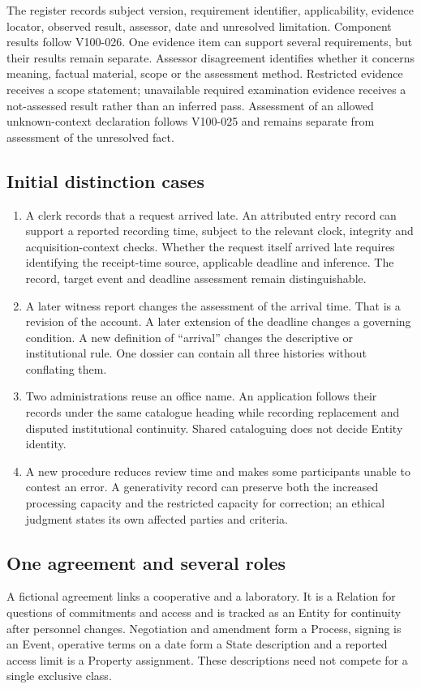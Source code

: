 \documentclass[11pt,a4paper]{article}
\begin{document}
The register records subject version, requirement identifier, applicability, evidence locator, observed result, assessor, date and unresolved limitation. Component results follow V100-026. One evidence item can support several requirements, but their results remain separate. Assessor disagreement identifies whether it concerns meaning, factual material, scope or the assessment method. Restricted evidence receives a scope statement; unavailable required examination evidence receives a not-assessed result rather than an inferred pass. Assessment of an allowed unknown-context declaration follows V100-025 and remains separate from assessment of the unresolved fact.


\subsection{Initial distinction cases}

\begin{enumerate}
\item A clerk records that a request arrived late. An attributed entry record can support a reported recording time, subject to the relevant clock, integrity and acquisition-context checks. Whether the request itself arrived late requires identifying the receipt-time source, applicable deadline and inference. The record, target event and deadline assessment remain distinguishable.
\item A later witness report changes the assessment of the arrival time. That is a revision of the account. A later extension of the deadline changes a governing condition. A new definition of ``arrival'' changes the descriptive or institutional rule. One dossier can contain all three histories without conflating them.
\item Two administrations reuse an office name. An application follows their records under the same catalogue heading while recording replacement and disputed institutional continuity. Shared cataloguing does not decide Entity identity.
\item A new procedure reduces review time and makes some participants unable to contest an error. A generativity record can preserve both the increased processing capacity and the restricted capacity for correction; an ethical judgment states its own affected parties and criteria.
\end{enumerate}


\subsection{One agreement and several roles}
A fictional agreement links a cooperative and a laboratory. It is a Relation for questions of commitments and access and is tracked as an Entity for continuity after personnel changes. Negotiation and amendment form a Process, signing is an Event, operative terms on a date form a State description and a reported access limit is a Property assignment. These descriptions need not compete for a single exclusive class.
\end{document}
